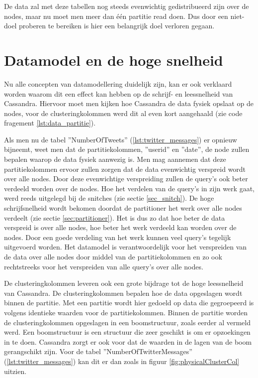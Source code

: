De data zal met deze tabellen nog steeds evenwichtig gedistribueerd zijn over de nodes, maar nu moet men meer dan één partitie read doen.
Dus door een niet-doel proberen te bereiken is hier een belangrijk doel verloren gegaan.

\section{Datamodel en de hoge snelheid}
\label{sec:highthroughput}
Nu alle concepten van datamodellering duidelijk zijn, kan er ook verklaard worden waarom dit een effect kan hebben op de schrijf- en leessnelheid van Cassandra.
Hiervoor moet men kijken hoe Cassandra de data fysiek opslaat op de nodes, voor de clusteringkolommen werd dit al even kort aangehaald (zie code fragement \ref{lst:data_partitie}).

Als men nu de tabel ''NumberOfTweets'' (\ref{lst:twitter_messages}) er opnieuw bijneemt, weet men dat de partitiekolommen, ''userid'' en ''date'', de node zullen bepalen waarop de data fysiek aanwezig is.
Men mag aannemen dat deze partitiekolommen ervoor zullen zorgen dat de data evenwichtig verspreid wordt over alle nodes.
Door deze evenwichtige verspreiding zullen de query's ook beter verdeeld worden over de nodes.
Hoe het verdelen van de query's in zijn werk gaat, werd reeds uitgelegd bij de snitches (zie sectie \ref{sec_snitch}).
De hoge schrijfsnelheid wordt bekomen doordat de partitioner het werk over alle nodes verdeelt (zie sectie \ref{sec:partitioner}).
Het is dus zo dat hoe beter de data verspreid is over alle nodes, hoe beter het werk verdeeld kan worden over de nodes.
Door een goede verdeling van het werk kunnen veel query's tegelijk uitgevoerd worden.
Het datamodel is verantwoordelijk voor het verspreiden van de data over alle nodes door middel van de partitiekolommen en zo ook rechtstreeks voor het verspreiden van alle query's over alle nodes.

De clusteringkolommen leveren ook een grote bijdrage tot de hoge leessnelheid van Cassandra.
De clusteringkolommen bepalen hoe de data opgeslagen wordt binnen de partitie.
Met een partitie wordt hier gedoeld op data die gegroepeerd is volgens identieke waarden voor de partitiekolommen.
Binnen de partitie worden de clusteringkolommen opgeslagen in een boomstructuur, zoals eerder al vermeld werd.
Een boomstructuur is een structuur die zeer geschikt is om er opzoekingen in te doen.
Cassandra zorgt er ook voor dat de waarden in de lagen van de boom gerangschikt zijn.
Voor de tabel ''NumberOfTwitterMessages'' (\ref{lst:twitter_messages}) kan dit er dan zoals in figuur \ref{fig:physicalClusterCol} uitzien.


